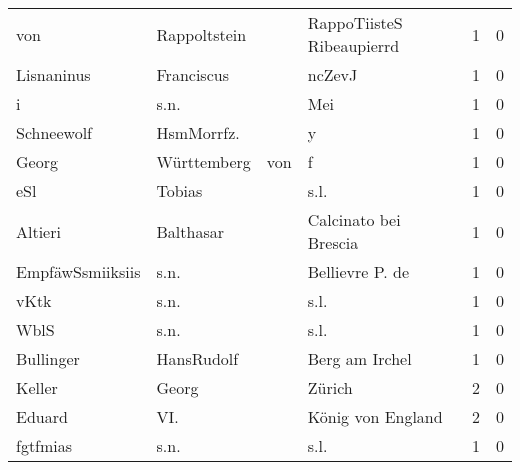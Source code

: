 \documentclass[10pt,a4paper,landscape]{article}
\begin{document}
\begin{longtable}{llllrr}
                      von &                       Rappoltstein &             &                   RappoTiisteS Ribeaupierrd &          1 &         0 \\
               Lisnaninus &                         Franciscus &             &                                      ncZevJ &          1 &         0 \\
                        i &                               s.n. &             &                                         Mei &          1 &         0 \\
               Schneewolf &                         HsmMorrfz. &             &                                           y &          1 &         0 \\
                    Georg &                        Württemberg &         von &                                           f &          1 &         0 \\
                      eSl &                             Tobias &             &                                        s.l. &          1 &         0 \\
                  Altieri &                          Balthasar &             &                       Calcinato bei Brescia &          1 &         0 \\
         EmpfäwSsmiiksiis &                               s.n. &             &                             Bellievre P. de &          1 &         0 \\
                     vKtk &                               s.n. &             &                                        s.l. &          1 &         0 \\
                     WblS &                               s.n. &             &                                        s.l. &          1 &         0 \\
                Bullinger &                         HansRudolf &             &                              Berg am Irchel &          1 &         0 \\
                   Keller &                              Georg &             &                                      Zürich &          2 &         0 \\
                   Eduard &                                VI. &             &                           König von England &          2 &         0 \\
                 fgtfmias &                               s.n. &             &                                        s.l. &          1 &         0 \\

\end{longtable}
\end{document}
